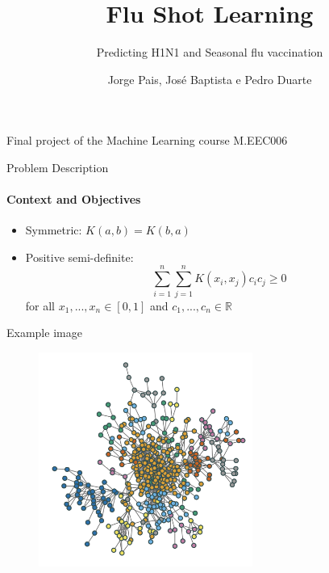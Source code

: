 \documentclass[dvipsnames, handout]{beamer}
\newcommand{\R}{\mathbb{R}}	%
\newcommand{\1}{\mathds{1}}	%
\begin{document}

\title{\color{titleText} Flu Shot Learning}
\subtitle{\color{titleText}Predicting H1N1 and Seasonal flu vaccination}
\author{Jorge Pais, José Baptista e Pedro Duarte\vspace{-.3cm}}
\date{}

\begin{frame}
\titlepage
\vspace{-1.2cm}
\begin{center}
    \begin{spacing}{1.2}\scriptsize 
    Final project of the Machine Learning course M.EEC006 
    \end{spacing}
\end{center}
\end{frame}


\begin{frame}{Problem Description}
\framesubtitle{Context and Objectives}

\begin{itemize}
\item Symmetric: $K(a,b)=K(b,a)$\pause
\item Positive semi-definite: $$\sum_{i=1}^n\sum_{j=1}^nK(x_i,x_j)c_ic_j\geq 0$$ for all $x_1,...,x_n\in[0,1]$ and $c_1,...,c_n\in\R$
\end{itemize}
\pause 

\end{frame}

\begin{frame}{Example image}
\begin{figure}[H]
\centering\includegraphics[width=7cm]{ExampleImage}	
\end{figure}
\end{frame}
\end{document}

